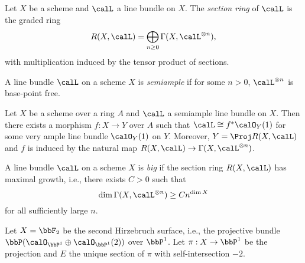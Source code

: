     \begin{definition}\label{def:section_ring}
        Let \(X\) be a scheme and \(\calL\) a line bundle on \(X\).
        The \emph{section ring} of \(\calL\) is the graded ring
        \[
            R(X,\calL) = \bigoplus_{n\ge 0} \Gamma(X,\calL^{\otimes n}),
        \]
        with multiplication induced by the tensor product of sections.
        
    \end{definition}

    \begin{definition}\label{def:semiample_line_bundle}
        A line bundle \(\calL\) on a scheme \(X\) is \emph{semiample} if for some \(n>0\), \(\calL^{\otimes n}\) is base-point free.
        
    \end{definition}

    \begin{theorem}\label{thm:fibration_associated_to_semiample_line_bundle}
        Let \(X\) be a scheme over a ring \(A\) and \(\calL\) a semiample line bundle on \(X\).
        Then there exists a morphism \(f:X\to Y\) over \(A\) such that \(\calL\cong f^*\calO_Y(1)\) for some very ample line bundle \(\calO_Y(1)\) on \(Y\).
        Moreover, \(Y=\Proj R(X,\calL)\) and \(f\) is induced by the natural map \(R(X,\calL)\to \Gamma(X,\calL^{\otimes n})\).
        
    \end{theorem}

    \begin{definition}\label{def:big_line_bundle}
        A line bundle \(\calL\) on a scheme \(X\) is \emph{big} if the section ring \(R(X,\calL)\) has maximal growth, i.e., there exists \(C>0\) such that
        \[
            \dim \Gamma(X,\calL^{\otimes n}) \ge C n^{\dim X}
        \]
        for all sufficiently large \(n\).
        
    \end{definition}

    \begin{example}\label{eg:base_locus_-K_of_Hirzebruch_surface}
        Let \(X=\bbF_2\) be the second Hirzebruch surface, i.e., the projective bundle \(\bbP(\calO_{\bbP^1}\oplus \calO_{\bbP^1}(2))\) over \(\bbP^1\).
        Let \(\pi:X\to \bbP^1\) be the projection and \(E\) the unique section of \(\pi\) with self-intersection \(-2\).
        
    \end{example}


